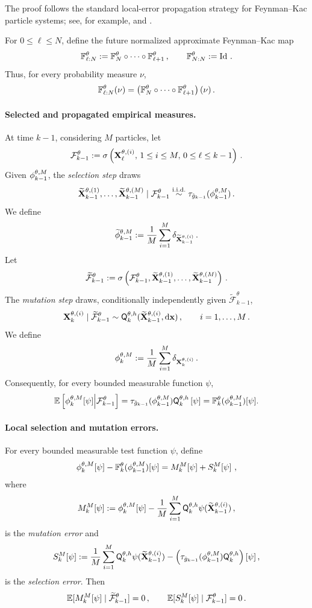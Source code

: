 \documentclass[11pt]{article}
\theoremstyle{plain}
\theoremstyle{definition}
\theoremstyle{remark}
\begin{document}
The proof follows the standard local-error propagation strategy for
Feynman--Kac particle systems; see, for example,
\citet[Section~7.4.3]{delmoral2004feynman} and
\citet{whiteley2012sequential}.

For $0\le \ell\le N$, define the future normalized approximate
Feynman--Kac map
$$
\filtertransform{\ell:N}[\theta]
\eqdef \filtertransform{N}[\theta]\circ\cdots\circ \filtertransform{\ell+1}[\theta] \eqsp,
\qquad \filtertransform{N:N}[\theta]\eqdef \operatorname{Id} \eqsp.
$$
Thus, for every probability measure $\nu$,
$$
\filtertransform{\ell:N}[\theta](\nu) = \left( \filtertransform{N}[\theta]\circ\cdots\circ \filtertransform{\ell+1}[\theta] \right)(\nu) \eqsp.
$$

\paragraph{Selected and propagated empirical measures.}
At time $k-1$, considering $M$ particles, let
$$
\mathcal F_{k-1}^{\theta} := \sigma\left( \mathbf{X}_\ell^{\theta,(i)},\,1\le i\le M,\,0\le \ell\le k-1 \right) \,.
$$
Given $\mcfilter{k-1}$, the \emph{selection step} draws
$$
\widetilde \X_{k-1}^{\theta,(1)},\ldots, \widetilde \X_{k-1}^{\theta,(M)}\mid \mathcal F_{k-1}^{\theta} \overset{\mathrm{i.i.d.}}{\sim} \tau_{\approxpot{k-1}}(\mcfilter{k-1}) \eqsp.
$$
We define
$$
\tildemcfilter{k-1} \eqdef \frac1M\sum_{i=1}^{M} \delta_{\widetilde \X_{k-1}^{\theta,(i)}} \eqsp.
$$
Let
$$
\widetilde{\mathcal F}_{k-1}^{\theta}
:= \sigma\left( \mathcal F_{k-1}^{\theta}, \widetilde {\mathbf{X}}_{k-1}^{\theta,(1)},\ldots, \widetilde {\mathbf{X}}_{k-1}^{\theta,(M)} \right) \,.
$$
The \emph{mutation step} draws, conditionally independently given $\widetilde{\mathcal F}_{k-1}^{\theta}$,
$$
\X_k^{\theta,(i)} \mid \widetilde{\mathcal F}_{k-1}^{\theta} \sim \mk{k}[\theta,h](\widetilde \X_{k-1}^{\theta,(i)},\rmd \x) \eqsp, \qquad i=1,\ldots,M \eqsp.
$$
We define
$$
\mcfilter{k} \eqdef \frac1M \sum_{i=1}^{M} \delta_{\X_k^{\theta,(i)}} \eqsp.
$$
Consequently, for every bounded measurable function $\psi$,
$$
\E\left[ \mcfilter{k}[\psi] \middle| \mathcal F_{k-1}^{\theta} \right]
= \tau_{\approxpot{k-1}}(\mcfilter{k-1})\mk{k}[\theta,h] \left[ \psi \right] 
= \filtertransform{k}[\theta](\mcfilter{k-1})[\psi].
$$

\paragraph{Local selection and mutation errors.}

For every bounded measurable test function $\psi$, define
$$
\mcfilter{k}[\psi] - \filtertransform{k}[\theta](\mcfilter{k-1})[\psi] = \muterr{k}[\psi] + \selerr{k}[\psi] \eqsp,
$$
where 
$$
\muterr{k}[\psi] \eqdef \mcfilter{k}[\psi] - \frac1M \sum_{i=1}^{M} \mk{k}[\theta,h]\psi(\widetilde \X_{k-1}^{\theta,(i)}) \eqsp, 
$$
is the \emph{mutation error} and 
$$
\selerr{k}[\psi] \eqdef \frac1M \sum_{i=1}^{M} \mk{k}[\theta,h]\psi(\widetilde \X_{k-1}^{\theta,(i)}) - \left( \tau_{\approxpot{k-1}}(\mcfilter{k-1})\mk{k}[\theta,h] \right)[\psi] \eqsp,
$$
is the \emph{selection error}. Then
$$
\E[ \muterr{k}[\psi] \mid \widetilde{\mathcal F}^\theta_{k-1} ] = 0 \eqsp,
\qquad
\E[\selerr{k}[\psi]\mid\mathcal F^\theta_{k-1}] = 0 \eqsp.
$$
\end{document}
